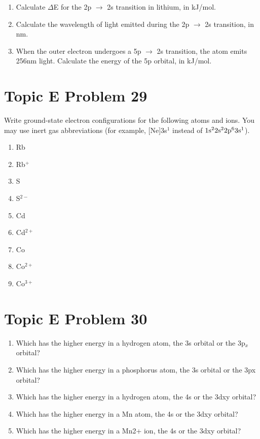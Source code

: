 \documentclass[10pt]{article}
\begin{document}
        \begin{enumerate}
            \item   Calculate $\Delta$E for the 2p $\rightarrow$ 2s transition in lithium, in kJ/mol.
            \item   Calculate the wavelength of light emitted during the 2p $\rightarrow$ 2s transition, in nm.
            \item   When the outer electron undergoes a 5p $\rightarrow$ 2s transition, the atom emits 256nm light. Calculate the energy of the 5p orbital, in kJ/mol.
        \end{enumerate}

    \pagebreak
    \section{Topic E Problem 29}
        Write ground-state electron configurations for the following atoms and ions. 
        You may use inert gas abbreviations (for example, [Ne]3s$^1$ instead of $\rm 1s^2 2s^2 2p^6 3s^1$).
        \begin{multicols}{3}
            \begin{enumerate}
                \item   Rb
                \item   Rb$^+$
                \item   S
                \item   S$^{2-}$
                \item   Cd
                \item   Cd$^{2+}$
                \item   Co
                \item   Co$^{2+}$
                \item   Co$^{3+}$
            \end{enumerate}
        \end{multicols}

    \pagebreak
    \section{Topic E Problem 30}
        \begin{enumerate}[label=\alph*)]
            \item   Which has the higher energy in a hydrogen atom, the 3s orbital or the 3p$_x$ orbital?
            \item   Which has the higher energy in a phosphorus atom, the 3s orbital or the 3px orbital?
            \item   Which has the higher energy in a hydrogen atom, the 4s or the 3dxy orbital?
            \item   Which has the higher energy in a Mn atom, the 4s or the 3dxy orbital?
            \item   Which has the higher energy in a Mn2+ ion, the 4s or the 3dxy orbital?
        \end{enumerate}
\end{document}
